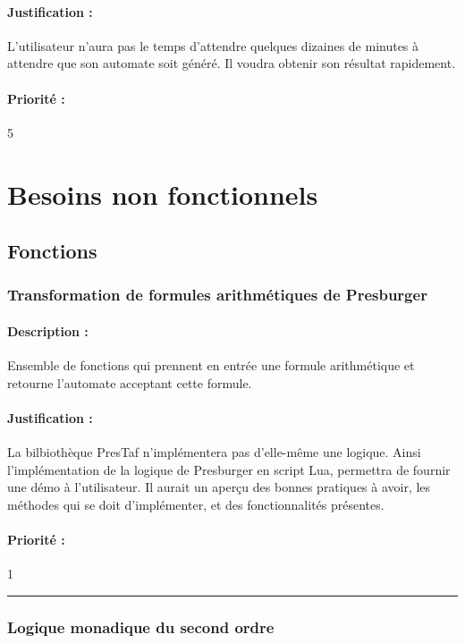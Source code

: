 \documentclass{article}%
\begin{document}
\paragraph{Justification :} L'utilisateur n'aura pas le temps d'attendre quelques dizaines de minutes à attendre que son automate soit généré. Il voudra obtenir son résultat rapidement.

\paragraph{Priorité :} 5

\section{Besoins non fonctionnels}

\subsection{Fonctions}

\subsubsection{Transformation de formules arithmétiques de Presburger}

\paragraph{Description :} Ensemble de fonctions qui prennent en entrée une formule arithmétique et retourne l'automate acceptant cette formule.

\paragraph{Justification :} La bilbiothèque PresTaf n'implémentera pas d'elle-même une logique. Ainsi l'implémentation de la logique de Presburger en script Lua, permettra de fournir une démo à l'utilisateur. Il aurait un aperçu des bonnes pratiques à avoir, les méthodes qui se doit d'implémenter, et des fonctionnalités présentes.

\paragraph{Priorité :} 1\\

\rule{\linewidth}{1pt}

\subsubsection{Logique monadique du second ordre}
\end{document}
